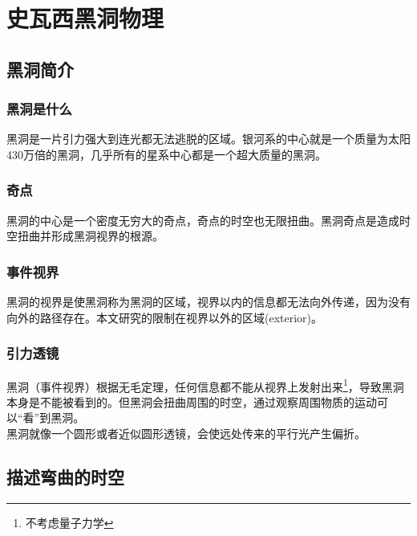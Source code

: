 %
%
%
%
%
%

\chapter{史瓦西黑洞物理}
\section{黑洞简介}
\subsection{黑洞是什么}
黑洞是一片引力强大到连光都无法逃脱的区域\cite{what_is_black_hole}。银河系的中心就是一个质量为太阳430万倍的黑洞\cite{galactic_center_bh}，几乎所有的星系中心都是一个超大质量的黑洞。
\subsection{奇点}
黑洞的中心是一个密度无穷大的奇点，奇点的时空也无限扭曲。黑洞奇点是造成时空扭曲并形成黑洞视界的根源。
\subsection{事件视界}
黑洞的视界是使黑洞称为黑洞的区域，视界以内的信息都无法向外传递，因为没有向外的路径存在。本文研究的限制在视界以外的区域(exterior)。
\subsection{引力透镜}
黑洞（事件视界）根据无毛定理，任何信息都不能从视界上发射出来\footnote{不考虑量子力学}，导致黑洞本身是不能被看到的。但黑洞会扭曲周围的时空，通过观察周围物质的运动可以“看”到黑洞。\\
黑洞就像一个圆形或者近似圆形透镜，会使远处传来的平行光产生偏折。

\section{描述弯曲的时空}
